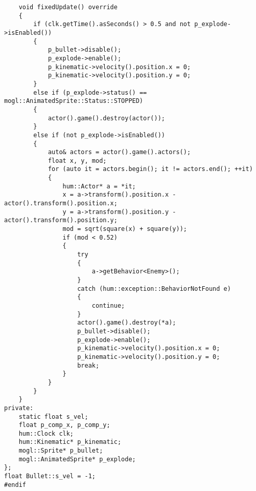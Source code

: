 \begin{lstlisting}
    void fixedUpdate() override
    {
        if (clk.getTime().asSeconds() > 0.5 and not p_explode->isEnabled())
        {
            p_bullet->disable();
            p_explode->enable();
            p_kinematic->velocity().position.x = 0;
            p_kinematic->velocity().position.y = 0;
        }
        else if (p_explode->status() == mogl::AnimatedSprite::Status::STOPPED)
        {
            actor().game().destroy(actor());
        }
        else if (not p_explode->isEnabled())
        {
            auto& actors = actor().game().actors();
            float x, y, mod;
            for (auto it = actors.begin(); it != actors.end(); ++it)
            {
                hum::Actor* a = *it;
                x = a->transform().position.x - actor().transform().position.x;
                y = a->transform().position.y - actor().transform().position.y;
                mod = sqrt(square(x) + square(y));
                if (mod < 0.52)
                {
                    try
                    {
                        a->getBehavior<Enemy>();
                    }
                    catch (hum::exception::BehaviorNotFound e)
                    {
                        continue;
                    }
                    actor().game().destroy(*a);
                    p_bullet->disable();
                    p_explode->enable();
                    p_kinematic->velocity().position.x = 0;
                    p_kinematic->velocity().position.y = 0;
                    break;
                }
            }
        }
    }
private:
    static float s_vel;
    float p_comp_x, p_comp_y;
    hum::Clock clk;
    hum::Kinematic* p_kinematic;
    mogl::Sprite* p_bullet;
    mogl::AnimatedSprite* p_explode;
};
float Bullet::s_vel = -1;
#endif
\end{lstlisting}
